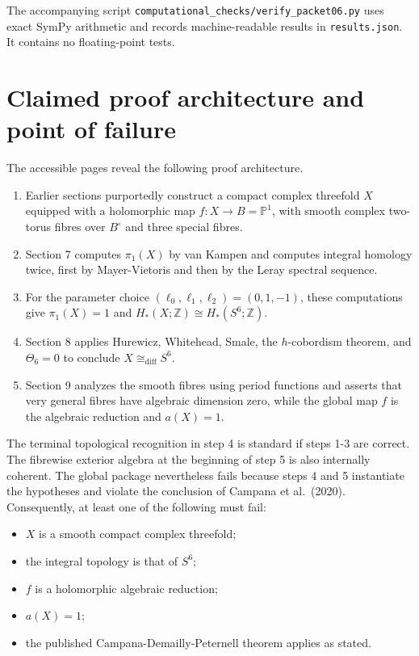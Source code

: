 \documentclass[
  10pt,
]{article}
\providecommand{\tightlist}{%
  \setlength{\itemsep}{0pt}\setlength{\parskip}{0pt}}
\begin{document}
The accompanying script
\texttt{computational\_checks/verify\_packet06.py} uses exact SymPy
arithmetic and records machine-readable results in
\texttt{results.json}. It contains no floating-point tests.

\section{Claimed proof architecture and point of
failure}\label{claimed-proof-architecture-and-point-of-failure}

The accessible pages reveal the following proof architecture.

\begin{enumerate}
\def\labelenumi{\arabic{enumi}.}
\tightlist
\item
  Earlier sections purportedly construct a compact complex threefold
  \(X\) equipped with a holomorphic map \(f:X\to B=\mathbb P^1\), with
  smooth complex two-torus fibres over \(B^\circ\) and three special
  fibres.
\item
  Section 7 computes \(\pi_1(X)\) by van Kampen and computes integral
  homology twice, first by Mayer-Vietoris and then by the Leray spectral
  sequence.
\item
  For the parameter choice \((\ell_0,\ell_1,\ell_2)=(0,1,-1)\), these
  computations give \(\pi_1(X)=1\) and
  \(H_*(X;\mathbb Z)\cong H_*(S^6;\mathbb Z)\).
\item
  Section 8 applies Hurewicz, Whitehead, Smale, the \(h\)-cobordism
  theorem, and \(\Theta_6=0\) to conclude \(X\cong_{\mathrm{diff}}S^6\).
\item
  Section 9 analyzes the smooth fibres using period functions and
  asserts that very general fibres have algebraic dimension zero, while
  the global map \(f\) is the algebraic reduction and \(a(X)=1\).
\end{enumerate}

The terminal topological recognition in step 4 is standard if steps 1-3
are correct. The fibrewise exterior algebra at the beginning of step 5
is also internally coherent. The global package nevertheless fails
because steps 4 and 5 instantiate the hypotheses and violate the
conclusion of Campana et al.~(2020). Consequently, at least one of the
following must fail:

\begin{itemize}
\tightlist
\item
  \(X\) is a smooth compact complex threefold;
\item
  the integral topology is that of \(S^6\);
\item
  \(f\) is a holomorphic algebraic reduction;
\item
  \(a(X)=1\);
\item
  the published Campana-Demailly-Peternell theorem applies as stated.
\end{itemize}
\end{document}
